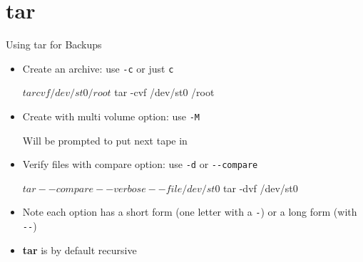 \section{tar}
\begin{frame}
   {Using tar for Backups}

   \begin{itemize}
      \item Create an archive: use \texttt{-c} or just \texttt{c}
      \begin{cmd}
$ tar cvf  /dev/st0 /root
$ tar -cvf /dev/st0 /root
      \end{cmd}
      \item Create with multi volume option: use \texttt{-M}
      Will be prompted to put next tape in

      \item Verify files with compare option: use
      \texttt{-d} or \verb?--compare?
      \begin{cmd}
$ tar --compare --verbose --file /dev/st0
$ tar -dvf /dev/st0
      \end{cmd}
      \item
      Note each option has a short form (one letter with a
      \verb?-?) or a long form (with \verb?--?)
      \item \textbf{tar} is by default recursive
   \end{itemize}

\end{frame}

